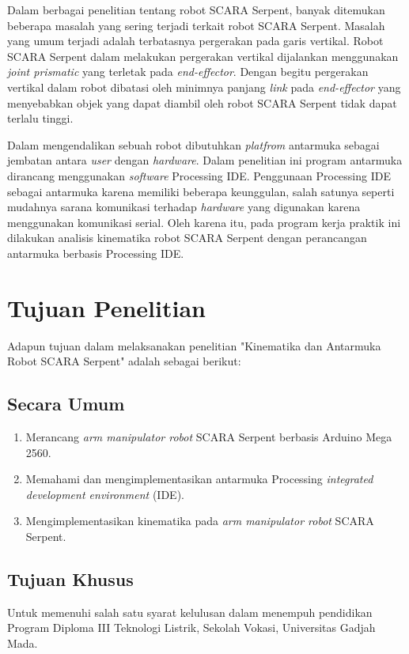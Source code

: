 Dalam berbagai penelitian tentang robot SCARA Serpent, banyak ditemukan beberapa masalah yang sering terjadi terkait robot SCARA Serpent. Masalah yang umum terjadi adalah terbatasnya pergerakan pada garis vertikal. Robot SCARA Serpent dalam melakukan pergerakan vertikal dijalankan menggunakan \textit{joint prismatic} yang terletak pada \textit{end-effector}. Dengan begitu pergerakan vertikal dalam robot dibatasi oleh minimnya panjang \textit{link} pada \textit{end-effector} yang menyebabkan objek yang dapat diambil oleh robot SCARA Serpent tidak dapat terlalu tinggi.

Dalam mengendalikan sebuah robot dibutuhkan \textit{platfrom} antarmuka sebagai jembatan antara \textit{user} dengan \emph{hardware}. Dalam penelitian ini program antarmuka dirancang menggunakan \textit{software} Processing IDE. Penggunaan Processing IDE sebagai antarmuka karena memiliki beberapa keunggulan, salah satunya seperti mudahnya sarana komunikasi terhadap \emph {hardware} yang digunakan karena menggunakan komunikasi serial. Oleh karena itu, pada program kerja praktik ini dilakukan analisis kinematika robot SCARA Serpent dengan perancangan antarmuka berbasis  Processing IDE.\\


\section{Tujuan Penelitian}
Adapun tujuan dalam melaksanakan penelitian "Kinematika dan Antarmuka Robot SCARA Serpent" adalah sebagai berikut:

\subsection{Secara Umum}
\begin{enumerate}
	\item Merancang\emph{ arm manipulator robot} SCARA Serpent berbasis Arduino Mega 2560.
	\item Memahami dan mengimplementasikan antarmuka Processing \textit{integrated development environment} (IDE).
	\item Mengimplementasikan kinematika pada \emph{arm manipulator robot} SCARA Serpent.
\end{enumerate}
\subsection{Tujuan Khusus}
Untuk memenuhi salah satu syarat kelulusan dalam menempuh pendidikan Program   Diploma III Teknologi Listrik, Sekolah Vokasi, Universitas Gadjah Mada. 


